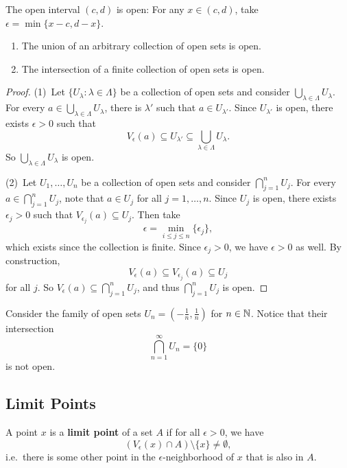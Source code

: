 \begin{example}
  The open interval $(c, d)$ is open: For any
  $x \in (c, d)$, take $\epsilon = \min\{x - c, d - x\}$.
\end{example}

\begin{theorem}\leavevmode
  \begin{enumerate}
    \item The union of an arbitrary collection of open sets
      is open.
    \item The intersection of a finite collection of
      open sets is open.
  \end{enumerate}
\end{theorem}

\begin{proof}
  (1)\, Let $\{U_\lambda : \lambda \in \Lambda\}$ be a
  collection of open sets and consider
  $\bigcup_{\lambda \in \Lambda} U_\lambda$. For
  every $a \in \bigcup_{\lambda \in \Lambda} U_\lambda$,
  there is $\lambda'$ such that $a \in U_{\lambda'}$.
  Since $U_{\lambda'}$ is open, there exists
  $\epsilon > 0$ such that
  \[V_\epsilon(a) \subseteq U_{\lambda'} \subseteq \bigcup_{\lambda \in \Lambda} U_\lambda.\]
  So $\bigcup_{\lambda \in \Lambda} U_\lambda$ is open.

  (2)\, Let $U_1, \ldots, U_n$ be a collection of
  open sets and consider $\bigcap_{j = 1}^n U_j$.
  For every $a \in \bigcap_{j = 1}^n U_j$, note that
  $a \in U_j$ for all $j = 1, \ldots, n$. Since
  $U_j$ is open, there exists $\epsilon_j > 0$ such that
  $V_{\epsilon_j}(a) \subseteq U_j$. Then take
  \[\epsilon = \min_{i \le j \le n}\{\epsilon_j\},\]
  which exists since the collection is finite.
  Since $\epsilon_j > 0$, we have $\epsilon > 0$ as well.
  By construction,
  \[V_\epsilon(a) \subseteq V_{\epsilon_j}(a) \subseteq U_j\]
  for all $j$. So
  $V_\epsilon(a) \subseteq \bigcap_{j = 1}^n U_j$, and
  thus $\bigcap_{j = 1}^n U_j$ is open.
\end{proof}

\begin{example}
  Consider the family of open sets
  $U_n = (-\frac{1}{n}, \frac{1}{n})$ for $n \in \mathbb{N}$. Notice
  that their intersection
  \[\bigcap_{n = 1}^\infty U_n = \{0\}\]
  is not open.
\end{example}

\subsection{Limit Points}
\begin{definition}
  A point $x$ is a \textbf{limit point} of a set
  $A$ if for all $\epsilon > 0$, 
  we have
  \[(V_\epsilon(x) \cap A) \setminus \{x\} \ne \emptyset,\]
  i.e.~there is some other point in the
  $\epsilon$-neighborhood of $x$ that is also in $A$.
\end{definition}


